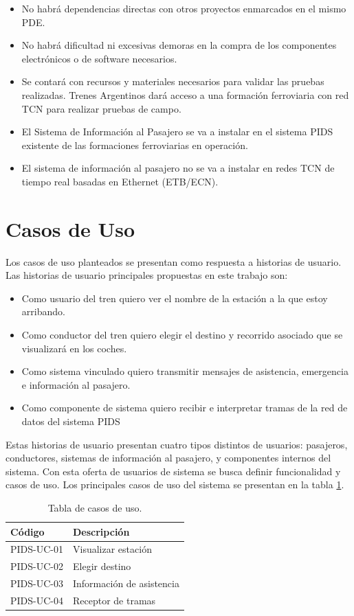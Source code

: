 \begin{itemize}
\item No habrá dependencias directas con otros proyectos enmarcados en el mismo PDE\citep{PDE-TCN}.
\item No habrá dificultad ni excesivas demoras en la compra de los componentes electrónicos o
de software necesarios.
\item Se contará con recursos y materiales necesarios para validar las pruebas realizadas.
Trenes Argentinos dará acceso a una formación ferroviaria con red TCN para realizar
pruebas de campo.
\item El Sistema de Información al Pasajero se va a instalar en el sistema PIDS existente de
las formaciones ferroviarias en operación.
\item El sistema de información al pasajero no se va a instalar en redes TCN de tiempo real
basadas en Ethernet (ETB/ECN).
\end{itemize}


\section{Casos de Uso}
Los casos de uso planteados se presentan como respuesta a historias de usuario. Las historias de usuario principales propuestas en este trabajo son:
\begin{itemize}
\item Como usuario del tren quiero ver el nombre de la estación a la que estoy arribando.
\item Como conductor del tren quiero elegir el destino y recorrido asociado que se visualizará en los coches.
\item Como sistema vinculado quiero transmitir mensajes de asistencia, emergencia e información al pasajero.
\item Como componente de sistema quiero recibir e interpretar tramas de la red de datos del sistema PIDS
\end{itemize}

Estas historias de usuario presentan cuatro tipos distintos de usuarios: pasajeros, conductores, sistemas de información al pasajero, y componentes internos del sistema. Con esta oferta de usuarios de sistema se busca definir funcionalidad y casos de uso. Los principales casos de uso del sistema se presentan en la tabla \ref{tab:UseCases}. \\

\begin{center}
\begin{table}[htb]
\begin{tabular}{|l|l|}
\hline
\textbf{Código} & \textbf{Descripción}     \\ \hline
PIDS-UC-01  & Visualizar estación         \\ \hline
PIDS-UC-02  & Elegir destino             \\ \hline
PIDS-UC-03  & Información de asistencia \\ \hline
PIDS-UC-04  & Receptor de tramas       \\ \hline
\end{tabular}
	\caption{Tabla de casos de uso.}
	\label{tab:UseCases}
\end{table}
\end{center}

